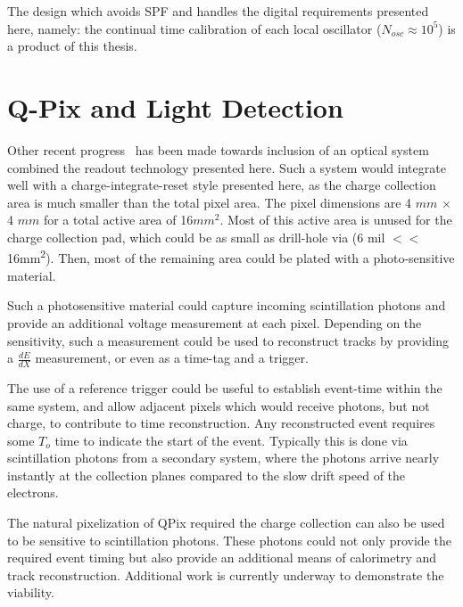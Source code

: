 The design which avoids SPF and handles the digital requirements presented here, namely: the continual time calibration of each local oscillator ($N_{osc} \approx 10^{5}$) is a product of this thesis.

\section{Q-Pix and Light Detection}

Other recent progress~\citep{https://doi.org/10.48550/arxiv.2207.11127} has been made towards inclusion of an optical system combined the readout technology presented here.
Such a system would integrate well with a charge-integrate-reset style presented here, as the charge collection area is much smaller than the total pixel area.
The pixel dimensions are 4 $\unit{mm}$ $\times$ 4 $\unit{mm} $ for a total active area of 16$\unit{mm^{2}}$.
Most of this active area is unused for the charge collection pad, which could be as small as drill-hole via (6 mil $<<$ 16\unit{mm^2}).
Then, most of the remaining area could be plated with a photo-sensitive material.

Such a photosensitive material could capture incoming scintillation photons and provide an additional voltage measurement at each pixel.
Depending on the sensitivity, such a measurement could be used to reconstruct tracks by providing a $\frac{dE}{dX}$ measurement, or even as a time-tag and a trigger.

The use of a reference trigger could be useful to establish event-time within the same system, and allow adjacent pixels which would receive photons, but not charge, to contribute to time reconstruction.
Any reconstructed event requires some $T_{o}$ time to indicate the start of the event.
Typically this is done via scintillation photons from a secondary system, where the photons arrive nearly instantly at the collection planes compared to the slow drift speed of the electrons.

The natural pixelization of QPix required the charge collection can also be used to be sensitive to scintillation photons.
These photons could not only provide the required event timing but also provide an additional means of calorimetry and track reconstruction.
Additional work is currently underway to demonstrate the viability.

